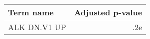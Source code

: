 \begin{tabular}{lr}
\toprule
   Term name &  Adjusted p-value \\
\midrule
ALK DN.V1 UP &               .2e \\
\bottomrule
\end{tabular}
